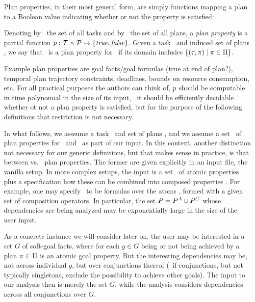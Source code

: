 Plan properties, in their most general form, are simply functions
mapping a plan to a Boolean value indicating whether or not the
property is satisfied:

\begin{definition}
Denoting by \alltasks\ the set of all tasks and by \allplans\ the set
of all plans, a \emph{plan property} is a partial function $p :
\cal T \times \cal P \mapsto \{\mathit{true}, \mathit{false}\}$. Given a task
\task\ and induced set of plans \plans, we say that \prop\ is a plan
property for \task\ if its domain includes $\{(\tau,\pi) \mid \pi
\in \Pi\}$.
\end{definition}

Example plan properties are goal facts/goal formulas (true at end of
plan?), temporal plan trajectory constraints, deadlines, bounds on
resource consumption, etc. For all practical purposes the authors can
think of, $p$ should be computable in time polynomial in the size
of its input, \ie\ it should be efficiently decidable whether ot not a
plan property is satisfied, but for the purpose of the following
definitions that restriction is not necessary.

In what follows, we asssume a task \task\ and set of plans \plans, and
we assume a set \props\ of plan properties for \task\ and \plans\ as
part of our input. In this context, another distinction not necessary
for our generic definitions, but that makes sense in practice, is that
between  vs.\  plan properties. The
former are given explicitly in an input file, the vanilla setup. In
more complex setups, the input is a set \propsatom\ of atomic
properties plus a specification how these can be combined into
composed properties \propscomp. For example, one may specify
\propscomp\ to be formulas over the atoms \propsatom, formed with a
given set of composition operators. In particular, the set $P =
P^A \cup P^C$ whose dependencies are being analyzed may
be exponentially large in the size of the user input.

As a concrete instance we will consider later on, the user may be
interested in a set $G$ of soft-goal facts, where for each $g \in G$
being or not being achieved by a plan $\pi \in \Pi$ is an atomic
goal property. But the interesting dependencies may be, not across
individual $g$, but over conjunctions thereof (\eg\ if conjunctions,
but not typically singletons, exclude the possibility to achieve other
goals). The input to our analysis then is merely the set $G$, while
the analysis considers dependencies across all conjunctions over $G$.

